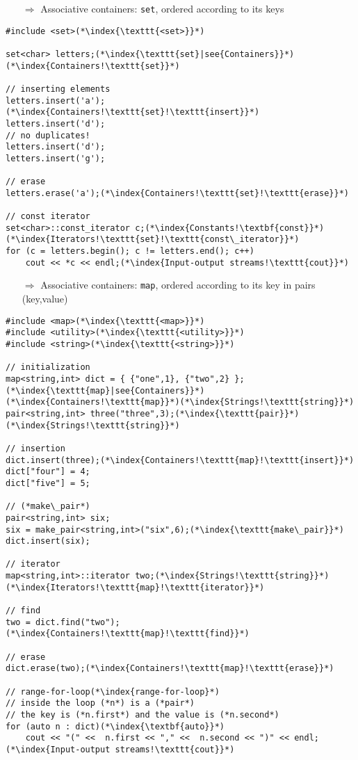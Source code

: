 \documentclass[10pt]{article}
\begin{document}
\begin{enumerate}
\item[$\Rightarrow$] Associative containers: \texttt{set}, ordered according to its keys
\end{enumerate}
\begin{lstlisting}
#include <set>(*\index{\texttt{<set>}}*)

set<char> letters;(*\index{\texttt{set}|see{Containers}}*)(*\index{Containers!\texttt{set}}*)

// inserting elements    
letters.insert('a');(*\index{Containers!\texttt{set}!\texttt{insert}}*)
letters.insert('d');
// no duplicates!
letters.insert('d');
letters.insert('g');

// erase    
letters.erase('a');(*\index{Containers!\texttt{set}!\texttt{erase}}*)

// const iterator 
set<char>::const_iterator c;(*\index{Constants!\textbf{const}}*)(*\index{Iterators!\texttt{set}!\texttt{const\_iterator}}*)
for (c = letters.begin(); c != letters.end(); c++)
    cout << *c << endl;(*\index{Input-output streams!\texttt{cout}}*)
\end{lstlisting}
\begin{enumerate}
\item[$\Rightarrow$] Associative containers: \texttt{map}, ordered according to its key in pairs (key,value)
\end{enumerate}
\begin{lstlisting}
#include <map>(*\index{\texttt{<map>}}*)
#include <utility>(*\index{\texttt{<utility>}}*)
#include <string>(*\index{\texttt{<string>}}*)

// initialization
map<string,int> dict = { {"one",1}, {"two",2} };(*\index{\texttt{map}|see{Containers}}*)(*\index{Containers!\texttt{map}}*)(*\index{Strings!\texttt{string}}*)
pair<string,int> three("three",3);(*\index{\texttt{pair}}*)(*\index{Strings!\texttt{string}}*)

// insertion    
dict.insert(three);(*\index{Containers!\texttt{map}!\texttt{insert}}*)
dict["four"] = 4;
dict["five"] = 5;

// (*make\_pair*)
pair<string,int> six;
six = make_pair<string,int>("six",6);(*\index{\texttt{make\_pair}}*)
dict.insert(six);

// iterator    
map<string,int>::iterator two;(*\index{Strings!\texttt{string}}*)(*\index{Iterators!\texttt{map}!\texttt{iterator}}*)

// find    
two = dict.find("two");(*\index{Containers!\texttt{map}!\texttt{find}}*)

// erase    
dict.erase(two);(*\index{Containers!\texttt{map}!\texttt{erase}}*)

// range-for-loop(*\index{range-for-loop}*)
// inside the loop (*n*) is a (*pair*)
// the key is (*n.first*) and the value is (*n.second*)
for (auto n : dict)(*\index{\textbf{auto}}*)
    cout << "(" <<  n.first << "," <<  n.second << ")" << endl;(*\index{Input-output streams!\texttt{cout}}*)
\end{lstlisting}
\end{document}
